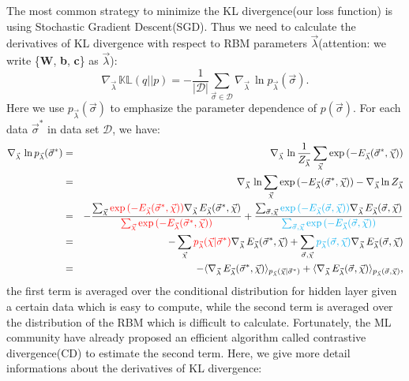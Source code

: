 \documentclass[letterpaper, 10pt]{article}
\newcommand{\qbar}{\rangle}
\newcommand{\qket}{\langle}
\begin{document}
The most common strategy to minimize the KL divergence(our loss function) is using Stochastic Gradient Descent(SGD). Thus we need to calculate the derivatives of KL divergence with respect to RBM parameters $\vec{\lambda}$(attention: we write \{\textbf{W}, \textbf{b}, \textbf{c}\} as $\vec{\lambda}$):
\begin{equation}
\nabla_{\vec{\lambda}} \, \mathbb{KL}(q||p) = - \frac{1}{|\mathcal{D}|} \sum_{\vec{\sigma} \in \mathcal{D}} \nabla_{\vec{\lambda}} \, \ln{p_{\vec{\lambda}}(\vec{\sigma})}.\label{eq:eq10}
\end{equation}
Here we use $p_{\vec{\lambda}}(\vec{\sigma})$ to emphasize the parameter dependence of $p(\vec{\sigma})$. For each data $\vec{\sigma}^*$ in data set $\mathcal{D}$, we have:
\begin{eqnarray*}
\nabla_{\vec{\lambda}} \, \ln{p_{\vec{\lambda}}(\vec{\sigma}^*)} & = & \nabla_{\vec{\lambda}} \, \ln \frac{1}{Z_{\vec{\lambda}}} \sum_{\vec{\chi}} \exp{( - E_{\vec{\lambda}}(\vec{\sigma}^*,\vec{\chi}) )} \\
	& = & \nabla_{\vec{\lambda}} \, \ln \sum_{\vec{\chi}} \exp{( - E_{\vec{\lambda}}(\vec{\sigma}^*,\vec{\chi}) )} - \nabla_{\vec{\lambda}} \ln Z_{\vec{\lambda}} \\
	& = & - \frac{\sum_{\vec{\chi}} {\color{red}{\exp{( - E_{\vec{\lambda}}(\vec{\sigma}^*,\vec{\chi}) )}}} \nabla_{\vec{\lambda}} \, E_{\vec{\lambda}}(\vec{\sigma}^*,\vec{\chi})}{ {\color{red}{\sum_{\vec{\chi}} \exp{( - E_{\vec{\lambda}}(\vec{\sigma}^*,\vec{\chi}) )}}} } + \frac{\sum_{\vec{\sigma},\vec{\chi}} {\color{cyan}{\exp{(-E_{\vec{\lambda}}(\vec{\sigma},\vec{\chi}))}}} \nabla_{\vec{\lambda}} \, E_{\vec{\lambda}}(\vec{\sigma},\vec{\chi})}{ {\color{cyan}{\sum_{\vec{\sigma},\vec{\chi}} \exp{(-E_{\vec{\lambda}}(\vec{\sigma},\vec{\chi}))}}} } \\
	& = & - \sum_{\vec{\chi}} {\color{red}{p_{\vec{\lambda}}(\vec{\chi} | \vec{\sigma}^*)}} \nabla_{\vec{\lambda}} \, E_{\vec{\lambda}}(\vec{\sigma}^*,\vec{\chi}) + \sum_{\vec{\sigma},\vec{\chi}} {\color{cyan}{p_{\vec{\lambda}}(\vec{\sigma},\vec{\chi})}} \nabla_{\vec{\lambda}} \, E_{\vec{\lambda}}(\vec{\sigma},\vec{\chi}) \\
	& = & - \qket \nabla_{\vec{\lambda}} \, E_{\vec{\lambda}}(\vec{\sigma}^*,\vec{\chi})\qbar_{p_{\vec{\lambda}}(\vec{\chi} | \vec{\sigma}^*)} + \qket\nabla_{\vec{\lambda}} \, E_{\vec{\lambda}}(\vec{\sigma},\vec{\chi})\qbar_{p_{\vec{\lambda}}(\vec{\sigma},\vec{\chi})},
\end{eqnarray*}
the first term is averaged over the conditional distribution for hidden layer given a certain data which is easy to compute, while the second term is averaged over the distribution of the RBM which is difficult to calculate. Fortunately, the ML community have already proposed an efficient algorithm called contrastive divergence(CD) to estimate the second term. Here, we give more detail informations about the derivatives of KL divergence:
\end{document}
